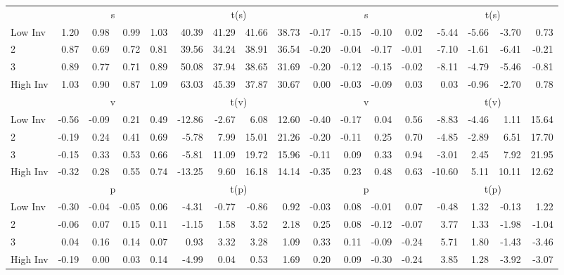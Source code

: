 \begin{table}[!ht]
\begin{tabular}{lrrrrrrrrrrrrrrrr}
  
     & \multicolumn{4}{c}{s} & \multicolumn{4}{c}{t(s)}  & \multicolumn{4}{c}{s} & \multicolumn{4}{c}{t(s)}   \\
     \cmidrule(r){2-5} \cmidrule(r){6-9}  \cmidrule(r){10-13} \cmidrule(r){14-17} 
    Low Inv  & 1.20  & 0.98  & 0.99  & 1.03  & 40.39  & 41.29  & 41.66  & 38.73  & -0.17  & -0.15  & -0.10  & 0.02  & -5.44  & -5.66  & -3.70  & 0.73   \\
    2  & 0.87  & 0.69  & 0.72  & 0.81  & 39.56  & 34.24  & 38.91  & 36.54  & -0.20  & -0.04  & -0.17  & -0.01  & -7.10  & -1.61  & -6.41  & -0.21   \\
    3  & 0.89  & 0.77  & 0.71  & 0.89  & 50.08  & 37.94  & 38.65  & 31.69  & -0.20  & -0.12  & -0.15  & -0.02  & -8.11  & -4.79  & -5.46  & -0.81   \\
    High Inv  & 1.03  & 0.90  & 0.87  & 1.09  & 63.03  & 45.39  & 37.87  & 30.67  & 0.00  & -0.03  & -0.09  & 0.03  & 0.03  & -0.96  & -2.70  & 0.78   \\
    
  
     & \multicolumn{4}{c}{v} & \multicolumn{4}{c}{t(v)}  & \multicolumn{4}{c}{v} & \multicolumn{4}{c}{t(v)}   \\
     \cmidrule(r){2-5} \cmidrule(r){6-9}  \cmidrule(r){10-13} \cmidrule(r){14-17} 
    Low Inv  & -0.56  & -0.09  & 0.21  & 0.49  & -12.86  & -2.67  & 6.08  & 12.60  & -0.40  & -0.17  & 0.04  & 0.56  & -8.83  & -4.46  & 1.11  & 15.64   \\
    2  & -0.19  & 0.24  & 0.41  & 0.69  & -5.78  & 7.99  & 15.01  & 21.26  & -0.20  & -0.11  & 0.25  & 0.70  & -4.85  & -2.89  & 6.51  & 17.70   \\
    3  & -0.15  & 0.33  & 0.53  & 0.66  & -5.81  & 11.09  & 19.72  & 15.96  & -0.11  & 0.09  & 0.33  & 0.94  & -3.01  & 2.45  & 7.92  & 21.95   \\
    High Inv  & -0.32  & 0.28  & 0.55  & 0.74  & -13.25  & 9.60  & 16.18  & 14.14  & -0.35  & 0.23  & 0.48  & 0.63  & -10.60  & 5.11  & 10.11  & 12.62   \\
    
  
     & \multicolumn{4}{c}{p} & \multicolumn{4}{c}{t(p)}  & \multicolumn{4}{c}{p} & \multicolumn{4}{c}{t(p)}   \\
     \cmidrule(r){2-5} \cmidrule(r){6-9}  \cmidrule(r){10-13} \cmidrule(r){14-17} 
    Low Inv  & -0.30  & -0.04  & -0.05  & 0.06  & -4.31  & -0.77  & -0.86  & 0.92  & -0.03  & 0.08  & -0.01  & 0.07  & -0.48  & 1.32  & -0.13  & 1.22   \\
    2  & -0.06  & 0.07  & 0.15  & 0.11  & -1.15  & 1.58  & 3.52  & 2.18  & 0.25  & 0.08  & -0.12  & -0.07  & 3.77  & 1.33  & -1.98  & -1.04   \\
    3  & 0.04  & 0.16  & 0.14  & 0.07  & 0.93  & 3.32  & 3.28  & 1.09  & 0.33  & 0.11  & -0.09  & -0.24  & 5.71  & 1.80  & -1.43  & -3.46   \\
    High Inv  & -0.19  & 0.00  & 0.03  & 0.14  & -4.99  & 0.04  & 0.53  & 1.69  & 0.20  & 0.09  & -0.30  & -0.24  & 3.85  & 1.28  & -3.92  & -3.07   \\
    

\end{tabular}
\end{table}
